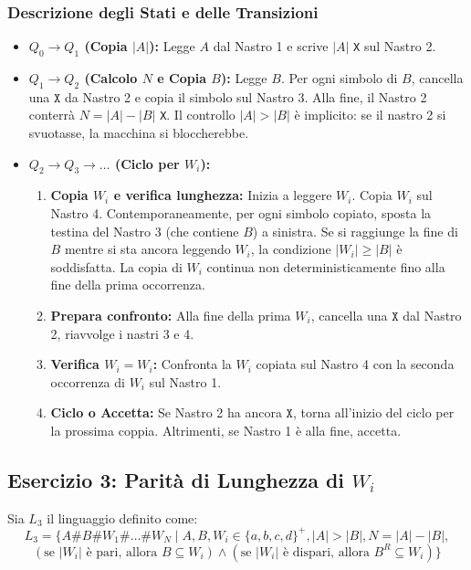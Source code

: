 \documentclass[a4paper]{article}
\newcommand{\Sh}{\texttt{\#}} %
\newcommand{\X}{\texttt{X}} %
\begin{document}
\subsubsection{Descrizione degli Stati e delle Transizioni}
\begin{itemize}
    \item \textbf{$Q_0 \to Q_1$ (Copia $|A|$):} Legge $A$ dal Nastro 1 e scrive $|A|$ \texttt{X} sul Nastro 2.
    \item \textbf{$Q_1 \to Q_2$ (Calcolo $N$ e Copia $B$):} Legge $B$. Per ogni simbolo di $B$, cancella una $\X$ da Nastro 2 e copia il simbolo sul Nastro 3. Alla fine, il Nastro 2 conterrà $N=|A|-|B|$ \texttt{X}. Il controllo $|A|>|B|$ è implicito: se il nastro 2 si svuotasse, la macchina si bloccherebbe.
    \item \textbf{$Q_2 \to Q_3 \to \dots$ (Ciclo per $W_i$):}
    \begin{enumerate}
        \item \textbf{Copia $W_i$ e verifica lunghezza:} Inizia a leggere $W_i$. Copia $W_i$ sul Nastro 4. Contemporaneamente, per ogni simbolo copiato, sposta la testina del Nastro 3 (che contiene $B$) a sinistra. Se si raggiunge la fine di $B$ mentre si sta ancora leggendo $W_i$, la condizione $|W_i| \ge |B|$ è soddisfatta. La copia di $W_i$ continua non deterministicamente fino alla fine della prima occorrenza.
        \item \textbf{Prepara confronto:} Alla fine della prima $W_i$, cancella una $\X$ dal Nastro 2, riavvolge i nastri 3 e 4.
        \item \textbf{Verifica $W_i=W_i$:} Confronta la $W_i$ copiata sul Nastro 4 con la seconda occorrenza di $W_i$ sul Nastro 1.
        \item \textbf{Ciclo o Accetta:} Se Nastro 2 ha ancora $\X$, torna all'inizio del ciclo per la prossima coppia. Altrimenti, se Nastro 1 è alla fine, accetta.
    \end{enumerate}
\end{itemize}


\subsection{Esercizio 3: Parità di Lunghezza di $W_i$}

Sia $L_3$ il linguaggio definito come:
\[
L_3 = \{A\Sh B\Sh W_1 \Sh \dots \Sh W_N \mid A, B, W_i \in \{a,b,c,d\}^+, |A| > |B|, N = |A| - |B|, 
\]
$\qquad (\text{se } |W_i| \text{ è pari, allora } B \subseteq W_i) \land (\text{se } |W_i| \text{ è dispari, allora } B^R \subseteq W_i) \}$
\end{document}
